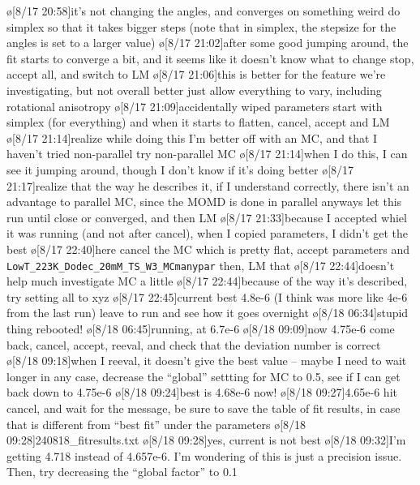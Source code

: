 \begin{err}
    \o[8/17 20:58]{it's not changing the angles, and converges on something weird}
    do simplex so that it takes bigger steps
    (note that in simplex, the stepsize for the angles is set to a larger value)
    \o[8/17 21:02]{after some good jumping around, the fit starts to converge a bit, and it seems like it doesn't know what to change}
    stop, accept all, and switch to LM
    \o[8/17 21:06]{this is better for the feature we're investigating, but not overall better}
    just allow everything to vary, including rotational anisotropy
    \o[8/17 21:09]{accidentally wiped parameters}
    start with simplex (for everything) and when it starts to flatten, cancel, accept and LM
    \o[8/17 21:14]{realize while doing this I'm better off with an MC, and that I haven't tried non-parallel}
    try non-parallel MC
    \o[8/17 21:14]{when I do this, I can see it jumping around, though I don't know if it's doing better}
    \o[8/17 21:17]{realize that the way he describes it, if I understand correctly, there isn't an advantage to parallel MC, since the MOMD is done in parallel anyways}
    let this run until close or converged, and then LM
    \o[8/17 21:33]{because I accepted whiel it was running (and not after cancel), when I copied parameters, I didn't get the best}
    \o[8/17 22:40]{here} cancel the MC which is pretty flat, accept parameters and
    \texttt{LowT_223K_Dodec_20mM_TS_W3_MCmanypar}
    then, LM that
    \o[8/17 22:44]{doesn't help much}
    investigate MC a little
    \o[8/17 22:44]{because of the way it's described, try}
    setting all to xyz
    \o[8/17 22:45]{current best 4.8e-6 (I think was more like 4e-6 from the last run)}
    leave to run and see how it goes overnight
    \o[8/18 06:34]{stupid thing rebooted!}
    \o[8/18 06:45]{running, at 6.7e-6}
    \o[8/18 09:09]{now 4.75e-6}
    come back, cancel, accept, reeval, and check that the deviation number is correct
    \o[8/18 09:18]{when I reeval, it doesn't give the best value -- maybe I need to wait longer}
    in any case, decrease the ``global'' settting for MC to 0.5, see if I can get back down to 4.75e-6
    \o[8/18 09:24]{best is 4.68e-6 now!}
    \o[8/18 09:27]{4.65e-6}
    hit cancel, and wait for the message,
    be sure to save the table of fit results, in case that is different from ``best fit'' under the parameters
    \o[8/18 09:28]{240818_fitresults.txt}
    \o[8/18 09:28]{yes, current is not best}
    \o[8/18 09:32]{I'm getting 4.718 instead of 4.657e-6.  I'm wondering of this is just a precision issue.}
    Then, try decreasing the ``global factor'' to 0.1

\end{err}
